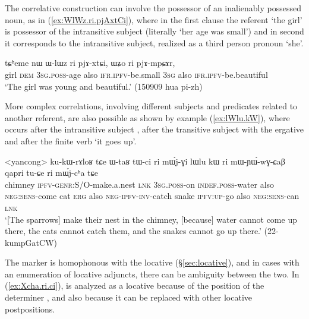 The correlative construction can involve the possessor of an inalienably possessed noun, as in (\ref{ex:WlWz.ri.pjAxtCi}), where in the first clause the referent `the girl' is possessor of the intransitive subject (literally `her age was small') and in second it corresponds to the intransitive subject, realized as a third person pronoun  `she'.

  \begin{exe}
\ex \label{ex:WlWz.ri.pjAxtCi}
 \gll tɕʰeme nɯ ɯ-lɯz ri pjɤ-xtɕi, ɯʑo ri pjɤ-mpɕɤr,  \\
 girl \textsc{dem} \textsc{3sg}.\textsc{poss}-age also \textsc{ifr}.\textsc{ipfv}-be.small \textsc{3sg} also \textsc{ifr}.\textsc{ipfv}-be.beautiful \\
\glt `The girl was young and beautiful.' (150909 hua pi-zh)
 \end{exe}
 
 More complex correlations, involving different subjects and predicates related to another referent, are also possible as shown by example (\ref{ex:lWlu.kW}), where  occurs after the intransitive subject , after the transitive subject  with the ergative and after the finite verb  `it goes up'.

   
 \begin{exe}
\ex   \label{ex:lWlu.kW}
\gll <yancong> ku-kɯ-rɤloʁ tɕe ɯ-taʁ tɯ-ci ri mɯ́j-ɣi lɯlu kɯ ri mɯ-ɲɯ́-wɣ-ɕaβ qapri tu-ɕe ri mɯ́j-cʰa tɕe \\
 chimney \textsc{ipfv}-\textsc{genr}:S/O-make.a.nest \textsc{lnk} \textsc{3sg}.\textsc{poss}-on \textsc{indef}.\textsc{poss}-water also \textsc{neg}:\textsc{sens}-come cat \textsc{erg} also \textsc{neg}-\textsc{ipfv}-\textsc{inv}-catch snake \textsc{ipfv}:\textsc{up}-go also \textsc{neg}:\textsc{sens}-can \textsc{lnk} \\
 \glt `[The sparrows] make their nest in the chimney, [because] water cannot come up there, the cats cannot catch them, and the snakes cannot go up there.' (22-kumpGatCW)
 \end{exe} 
 
 The marker  is homophonous with the locative  (§\ref{sec:locative}), and in cases with an enumeration of locative adjuncts, there can be ambiguity between the two. In (\ref{ex:Xcha.ri.ci}),  is analyzed as a locative because of the position of the determiner , and also because it can be replaced with other locative postpositions.
 
